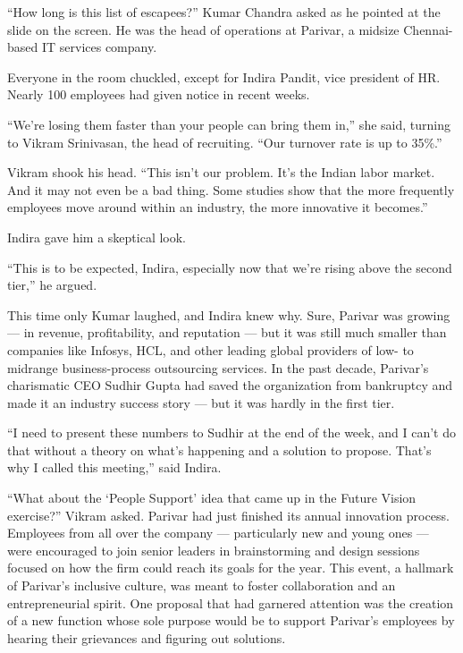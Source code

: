 \documentclass[10pt,a4paper]{book}
\begin{document}
\begin{multicols}{3} 
{\footnotesize “How long is this list of escapees?” Kumar Chandra asked as he pointed at the slide on the screen. He was the head of operations at Parivar, a midsize Chennai-based IT services company.

Everyone in the room chuckled, except for Indira Pandit, vice president of HR. Nearly 100 employees had given notice in recent weeks.

“We’re losing them faster than your people can bring them in,” she said, turning to Vikram Srinivasan, the head of recruiting. “Our turnover rate is up to 35\%.”

Vikram shook his head. “This isn’t our problem. It’s the Indian labor market. And it may not even be a bad thing. Some studies show that the more frequently employees move around within an industry, the more innovative it becomes.”

Indira gave him a skeptical look.

“This is to be expected, Indira, especially now that we’re rising above the second tier,” he argued.

This time only Kumar laughed, and Indira knew why. Sure, Parivar was growing — in revenue, profitability, and reputation — but it was still much smaller than companies like Infosys, HCL, and other leading global providers of low- to midrange business-process outsourcing services. In the past decade, Parivar’s charismatic CEO Sudhir Gupta had saved the organization from bankruptcy and made it an industry success story — but it was hardly in the first tier.

“I need to present these numbers to Sudhir at the end of the week, and I can’t do that without a theory on what’s happening and a solution to propose. That’s why I called this meeting,” said Indira.

“What about the ‘People Support’ idea that came up in the Future Vision exercise?” Vikram asked. Parivar had just finished its annual innovation process. Employees from all over the company — particularly new and young ones — were encouraged to join senior leaders in brainstorming and design sessions focused on how the firm could reach its goals for the year. This event, a hallmark of Parivar’s inclusive culture, was meant to foster collaboration and an entrepreneurial spirit. One proposal that had garnered attention was the creation of a new function whose sole purpose would be to support Parivar’s employees by hearing their grievances and figuring out solutions.

}
\end{multicols}
\end{document}
